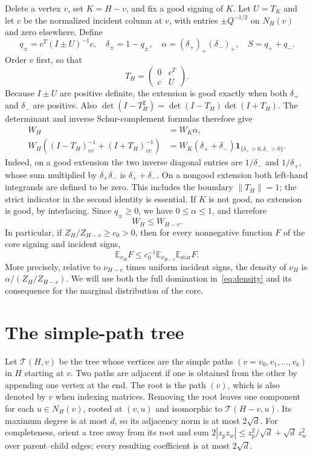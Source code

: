 \documentclass[11pt]{article}
\numberwithin{equation}{section}
\theoremstyle{remark}
\newcommand{\norm}[1]{\left\lVert#1\right\rVert}
\newcommand{\E}{\mathbb E}
\begin{document}
Delete a vertex $v$, set $K=H-v$, and fix a good signing of $K$.
Let $U=T_K$ and let $c$ be the normalized incident column at $v$,
with entries $\pm Q^{-1/2}$ on $N_H(v)$ and zero elsewhere. Define
\[
 q_\pm=c^T(I\pm U)^{-1}c,\quad
 \delta_\pm=1-q_\pm,\quad
 \alpha=(\delta_+)_+(\delta_-)_+,\quad S=q_++q_-.
\]
Order $v$ first, so that
\[
 T_H=\begin{pmatrix}0&c^T\\c&U\end{pmatrix}.
\]
Because $I\pm U$ are positive definite, the extension is good
exactly when both $\delta_+$ and $\delta_-$ are positive. Also
$\det(I-T_H^2)=\det(I-T_H)\det(I+T_H)$.
The determinant and inverse Schur-complement formulas therefore give
\begin{align}
 W_H&=W_K\alpha,\nonumber\\
 W_H\left((I-T_H)^{-1}_{vv}+(I+T_H)^{-1}_{vv}\right)
 &=W_K(\delta_++\delta_-)
   \mathbf1_{\{\delta_+>0,\delta_->0\}}.
 \label{eq:star}
\end{align}
Indeed, on a good extension the two inverse diagonal entries
are $1/\delta_-$ and $1/\delta_+$, whose sum multiplied by
$\delta_+\delta_-$ is $\delta_++\delta_-$.
On a nongood extension both left-hand integrands are defined to be
zero. This includes the boundary $\norm{T_H}=1$; the strict
indicator in the second identity is essential.
If $K$ is not good, no extension is good, by interlacing.
Since $q_\pm\ge0$, we have $0\le\alpha\le1$, and therefore
\begin{equation}\label{eq:domination}
 W_H\le W_{H-v}.
\end{equation}
In particular, if $Z_H/Z_{H-v}\ge c_0>0$, then for every nonnegative
function $F$ of the core signing and incident signs,
\begin{equation}\label{eq:density}
 \E_{\nu_H}F
 \le c_0^{-1}\E_{\nu_{H-v}}\E_{\mathrm{star}}F.
\end{equation}
More precisely, relative to $\nu_{H-v}$ times uniform incident
signs, the density of $\nu_H$ is $\alpha/(Z_H/Z_{H-v})$.
We will use both the full domination in~\eqref{eq:density} and its
consequence for the marginal distribution of the core.

\section{The simple-path tree}\label{sec:path-tree}

Let $\mathcal T(H,v)$ be the tree whose vertices are the simple
paths $(v=v_0,v_1,\ldots,v_k)$ in $H$ starting at $v$. Two paths
are adjacent if one is obtained from the other by appending one
vertex at the end. The root is the path $(v)$, which is also denoted by
$v$ when indexing matrices. Removing the root leaves one component
for each $u\in N_H(v)$, rooted at $(v,u)$ and isomorphic to
$\mathcal T(H-v,u)$.
Its maximum degree is at most $d$, so its adjacency norm is at most
$2\sqrt d$. For completeness, orient a tree away from its root and
sum
$2|z_pz_w|\le z_p^2/\sqrt d+\sqrt d\,z_w^2$
over parent--child edges; every resulting coefficient is at most
$2\sqrt d$.
\end{document}
